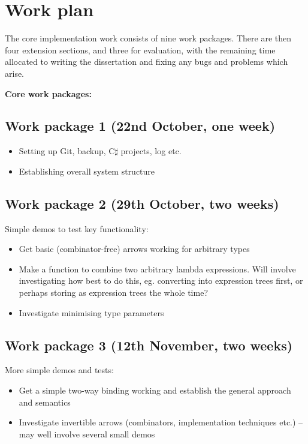 \documentclass[12pt,a4]{article}
\begin{document}
\section{Work plan}
	
	The core implementation work consists of nine work packages. There are then four extension sections, and three for evaluation, with the remaining time allocated to writing the dissertation and fixing any bugs and problems which arise.
	
	\noindent \textbf{Core work packages:}
	
	\subsection{Work package 1 (22nd October, one week)}
		\begin{itemize}
			\item Setting up Git, backup, C$\sharp$ projects, log etc.
			\item Establishing overall system structure
		\end{itemize}
	
	\subsection{Work package 2 (29th October, two weeks)}
		Simple demos to test key functionality:
		\begin{itemize}
			\item Get basic (combinator-free) arrows working for arbitrary types
			\item Make a function to combine two arbitrary lambda expressions. Will involve investigating how best to do this, eg. converting into expression trees first, or perhaps storing as expression trees the whole time?
			\item Investigate minimising type parameters
		\end{itemize}
	
	\subsection{Work package 3 (12th November, two weeks)}
		More simple demos and tests:
		\begin{itemize}
			\item Get a simple two-way binding working and establish the general approach and semantics
			\item Investigate invertible arrows (combinators, implementation techniques etc.) -- may well involve several small demos
		\end{itemize}
	
\end{document}
